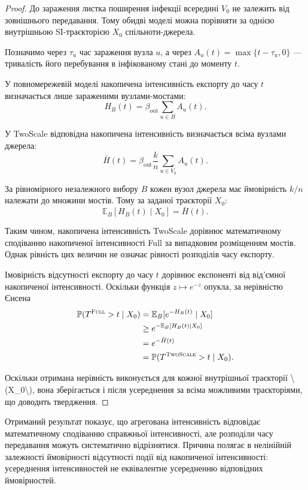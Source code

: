 \documentclass[a4paper,fleqn]{cas-sc}
\newcommand{\Full}{\textup{\textsc{Full}}}
\newcommand{\TS}{\textup{\textsc{TwoScale}}}
\begin{document}
\begin{proof}
До зараження листка поширення інфекції всередині $V_0$ не залежить від зовнішнього передавання. Тому обидві моделі можна порівняти за однією внутрішньою SI-траєкторією $X_0$ спільноти-джерела.

Позначимо через $\tau_u$ час зараження вузла $u$, а через $A_u(t)=\max\{t-\tau_u,0\}$ --- тривалість його перебування
в інфікованому стані до моменту $t$.

У повномережевій моделі накопичена інтенсивність експорту до часу $t$ визначається лише зараженими вузлами-мостами:
\[
H_B(t)
=
\beta_{\mathrm{out}}\sum_{u\in B}A_u(t).
\]

У TwoScale відповідна накопичена інтенсивність визначається всіма вузлами джерела:
\[
\bar H(t)
=
\beta_{\mathrm{out}}\frac{k}{n}
\sum_{u\in V_0}A_u(t).
\]

За рівномірного незалежного вибору $B$ кожен вузол джерела має ймовірність $k/n$ належати до множини мостів. Тому за заданої траєкторії $X_0$:
\[
\mathbb{E}_B[H_B(t)\mid X_0]
=
\bar H(t).
\]

Таким чином, накопичена інтенсивність TwoScale дорівнює математичному сподіванню накопиченої інтенсивності Full за випадковим розміщенням мостів. Однак рівність цих величин не означає рівності розподілів часу експорту.

Імовірність відсутності експорту до часу $t$ дорівнює експоненті від від'ємної накопиченої інтенсивності. Оскільки функція $z\mapsto e^{-z}$ опукла, за нерівністю Єнсена
\[
\begin{aligned}
\mathbb{P}(T^{\Full}>t\mid X_0)
&=
\mathbb{E}_B[e^{-H_B(t)}\mid X_0]
\\
&\geq
e^{-\mathbb{E}_B[H_B(t)\mid X_0]}
\\
&=
e^{-\bar H(t)}
\\
&=
\mathbb{P}(T^{\TS}>t\mid X_0).
\end{aligned}
\]

Оскільки отримана нерівність виконується для кожної внутрішньої траєкторії \textbackslash{}(X\_0\textbackslash{}), вона зберігається і після усереднення за всіма можливими траєкторіями, що доводить твердження. 
\end{proof}

Отриманий результат показує, що агрегована інтенсивність відповідає математичному сподіванню справжньої інтенсивності, але розподіли часу передавання можуть систематично відрізнятися. Причина полягає в нелінійній залежності ймовірності відсутності події від накопиченої інтенсивності: усереднення інтенсивностей не еквівалентне усередненню відповідних ймовірностей.
\end{document}
